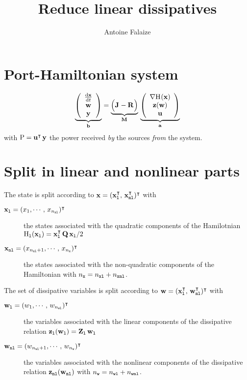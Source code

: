 \documentclass[10pt,a4paper]{article}
\author{Antoine Falaize}
\title{Reduce linear dissipatives}
\begin{document}

%
%
%
%
%
\section{Port-Hamiltonian system}
%
%
%
%
\begin{equation}
\underbrace{\left(
\begin{array}{c}
\D{\vx}{t}\\
\vw\\
\vy
\end{array}
\right)}_{\vec b}
=
\underbrace{\Big(\J{}-\R{}\Big)}_{\M{}}
\,
\underbrace{\left(
\begin{array}{c}
\dxH{}(\vx)\\
\vz(\vw)\\
\vu
\end{array}
\right)
}_{\vec a}
\end{equation}
%
%
with $\op P=\vu^\T\,\vy$ the power received \emph{by} the sources \emph{from} the system.
%
%
%
\section{Split in linear and nonlinear parts}
%
%
The state is split according to $\vx=(\vxl^\T, \,\vxnl^\T)^\T $ with 
%
\begin{description}
%
\item[$\vxl = (x_1,\cdots,\,x_\nxl)^\T$] the states associated with the quadratic components of the Hamilotnian $\Hl(\vxl)=\vxl^\T\,\Q\,\vxl/2$
%
\item[$\vxnl=(x_{\nxl+1},\cdots,\,x_\nx)^\T$] the states associated with the non-quadratic components of the Hamiltonian with $\nx = \nxl+\nxnl$.
%
\end{description}
%
%
The set of dissipative variables is split according to $\vw = (\vxl^\T, \, \vwnl^\T)^\T$ with 
%
\begin{description}
%
\item[$\vwl = (w_1,\cdots,\,w_\nwl)^\T$] the variables associated with the linear components of the dissipative relation $\vzl(\vwl)=\mat{Z}_{\lab l}\,\vwl$
%
\item[$\vwnl=(w_{\nwl+1},\cdots,\,w_\nw)^\T$] the variables associated with the nonlinear components of the dissipative relation $\vznl(\vwnl)$ with $\nw = \nwl+\nwnl$.
%
\end{description}
\end{document}
